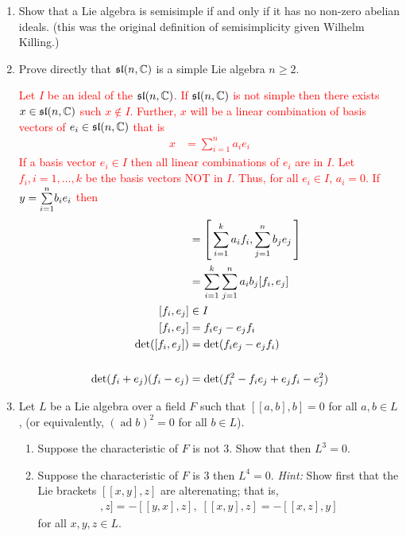 \documentclass[12pt,a4paper]{report}
\newcommand{\RED}[1]{\textcolor{red}{#1}}
\newcommand{\AD}{\operatorname{ad}}
\begin{document}
\begin{enumerate}[label=4.\arabic*]
\item Show that a Lie algebra is semisimple if and only if it has no non-zero abelian ideals.  (this was the original definition of semisimplicity given Wilhelm Killing.)

\item Prove directly that $\mathfrak{sl}(n,\mathbb{C})$ is a simple Lie algebra $n \ge 2$.

\RED{Let $I$ be an ideal of the $\mathfrak{sl}(n,\mathbb{C})$.  If $\mathfrak{sl}(n,\mathbb{C})$ is not simple then there exists $x \in \mathfrak{sl}(n,\mathbb{C})$ such $x \not \in I$.  Further, $x$ will be a linear combination of basis vectors of $e_i \in \mathfrak{sl}(n,\mathbb{C})$ that is 
\begin{align*}
	x &= \sum_{i=1}^n a_ie_i
\end{align*}If a basis vector $e_i \in I$ then all linear combinations of $e_i$ are in $I$.  Let $f_i, i=1,\dots,k$ be the basis vectors NOT in $I$.  Thus, for all $e_i\in I$, $a_i = 0$.  If $y = \underset{i=1}{\overset{n}{\sum}} b_ie_i$ then
\begin{align*}
	[x,y] &= \SQBRACKET{\sum_{i=1}^k a_if_i, \sum_{j=1}^n b_je_j} \\
	&= \sum_{i=1}^k\sum_{j=1}^na_ib_j[f_i, e_j] \\
	[f_i, e_j] & \in I \\
	[f_i,e_j] &= f_ie_j-e_jf_i \\
	\det ([f_i,e_j]) &= \det(f_ie_j -e_jf_i)\\
	\\
	\det(f_i+e_j)(f_i-e_j) &= \det(f_i^2-f_ie_j+e_jf_i-e_j^2)
\end{align*}
}

\item Let $L$ be a Lie algebra over a field $F$ such that $[[a,b],b]=0$ for all $a,b \in L$, (or equivalently, $(\AD b)^2=0$ for all $b \in L$).

\begin{enumerate}[label=(\roman*)]

	\item Suppose the characteristic of $F$ is not 3.  Show that then $L^3 = 0$.
	
	\item Suppose the characteristic of $F$ is 3 then $L^4 = 0$.  \textit{Hint:}  Show first that the Lie brackets $[[x,y],z]$ are alterenating; that is, 
	\begin{align*}
		[[x,y],z]=-[[y,x],z],\; [[x,y],z]=-[[x,z],y]
	\end{align*}for all $x,y,z \in L$.

\end{enumerate}


\end{enumerate}
\end{document}
